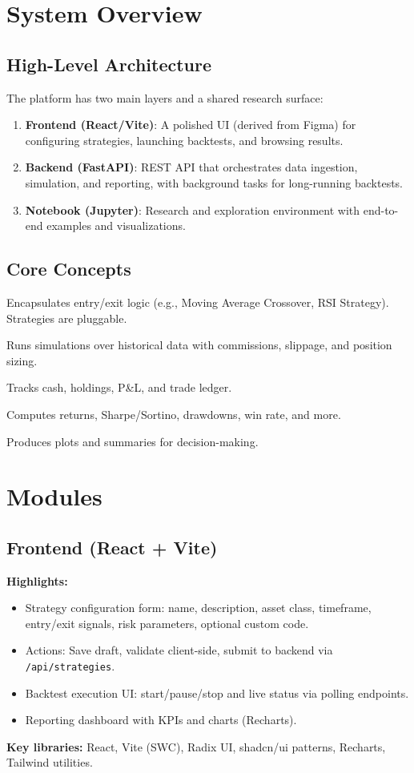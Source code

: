 \documentclass[11pt,a4paper]{article}
\begin{document}
\section{System Overview}
\subsection{High-Level Architecture}
The platform has two main layers and a shared research surface:
\begin{enumerate}[leftmargin=*]
  \item \textbf{Frontend (React/Vite)}: A polished UI (derived from Figma) for configuring strategies, launching backtests, and browsing results.
  \item \textbf{Backend (FastAPI)}: REST API that orchestrates data ingestion, simulation, and reporting, with background tasks for long-running backtests.
  \item \textbf{Notebook (Jupyter)}: Research and exploration environment with end-to-end examples and visualizations.
\end{enumerate}

\subsection{Core Concepts}
\begin{description}[leftmargin=*,style=nextline]
  \item[Strategy] Encapsulates entry/exit logic (e.g., Moving Average Crossover, RSI Strategy). Strategies are pluggable.
  \item[Engine] Runs simulations over historical data with commissions, slippage, and position sizing.
  \item[Portfolio/Trades] Tracks cash, holdings, P\&L, and trade ledger.
  \item[Metrics] Computes returns, Sharpe/Sortino, drawdowns, win rate, and more.
  \item[Reporting] Produces plots and summaries for decision-making.
\end{description}

\section{Modules}
\subsection{Frontend (React + Vite)}
\textbf{Highlights:}
\begin{itemize}[leftmargin=*]
  \item Strategy configuration form: name, description, asset class, timeframe, entry/exit signals, risk parameters, optional custom code.
  \item Actions: Save draft, validate client-side, submit to backend via \texttt{/api/strategies}.
  \item Backtest execution UI: start/pause/stop and live status via polling endpoints.
  \item Reporting dashboard with KPIs and charts (Recharts).
\end{itemize}
\textbf{Key libraries:} React, Vite (SWC), Radix UI, shadcn/ui patterns, Recharts, Tailwind utilities.
\end{document}
